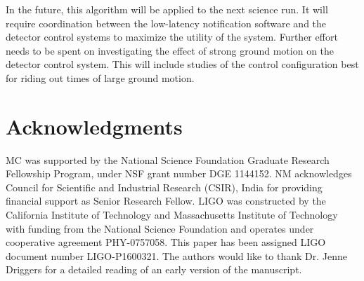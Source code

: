 \documentclass[twocolumn, prl, superscriptaddress]{revtex4}
\begin{document}
In the future, this algorithm will be applied to the next science run. It will require coordination between the low-latency notification software and the detector control systems to maximize the utility of the system. 
Further effort needs to be spent on investigating the effect of strong ground motion on the detector control system.
This will include studies of the control configuration best for riding out times of large ground motion.

\section{Acknowledgments}
MC was supported by the National Science Foundation Graduate Research Fellowship
Program, under NSF grant number DGE 1144152. 
NM acknowledges Council for Scientific and Industrial Research (CSIR), India for providing financial support as Senior Research Fellow.  
LIGO was constructed by the California Institute of Technology and Massachusetts Institute of Technology with funding from the National Science Foundation and operates under cooperative agreement PHY-0757058.
This paper has been assigned LIGO document number LIGO-P1600321.
The authors would like to thank Dr. Jenne Driggers for a detailed reading of an early version of the manuscript.



\end{document}
